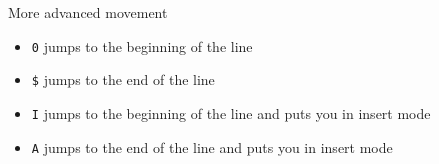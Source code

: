 \documentclass{beamer}
\begin{document}
\begin{frame}{More advanced movement}
	\begin{itemize}
		\item \texttt{0} jumps to the beginning of the line
		\item \texttt{\$} jumps to the end of the line
		\item \texttt{I} jumps to the beginning of the line and puts you in insert mode
		\item \texttt{A} jumps to the end of the line and puts you in insert mode
	\end{itemize}
\end{frame}
\end{document}
